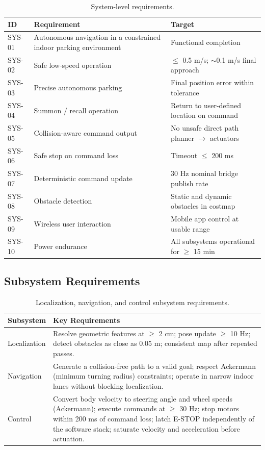 \documentclass[12pt,a4paper]{report}
\begin{document}
\begin{table}[H]
\centering
\caption{System-level requirements.}
\label{tab:sys_req}
\begin{tabularx}{\textwidth}{|p{1.7cm}|X|p{3.2cm}|}
\hline
\textbf{ID} & \textbf{Requirement} & \textbf{Target} \\
\hline
SYS-01 & Autonomous navigation in a constrained indoor parking environment & Functional completion \\
\hline
SYS-02 & Safe low-speed operation & $\leq$ 0.5 m/s; $\sim$0.1 m/s final approach \\
\hline
SYS-03 & Precise autonomous parking & Final position error within tolerance \\
\hline
SYS-04 & Summon / recall operation & Return to user-defined location on command \\
\hline
SYS-05 & Collision-aware command output & No unsafe direct path planner $\rightarrow$ actuators \\
\hline
SYS-06 & Safe stop on command loss & Timeout $\leq$ 200 ms \\
\hline
SYS-07 & Deterministic command update & 30 Hz nominal bridge publish rate \\
\hline
SYS-08 & Obstacle detection & Static and dynamic obstacles in costmap \\
\hline
SYS-09 & Wireless user interaction & Mobile app control at usable range \\
\hline
SYS-10 & Power endurance & All subsystems operational for $\geq$ 15 min \\
\hline
\end{tabularx}
\end{table}

\subsection{Subsystem Requirements}

\begin{table}[H]
\centering
\caption{Localization, navigation, and control subsystem requirements.}
\label{tab:sub_req}
\begin{tabularx}{\textwidth}{|p{3cm}|X|}
\hline
\textbf{Subsystem} & \textbf{Key Requirements} \\
\hline
Localization & Resolve geometric features at $\geq$ 2 cm; pose update $\geq$ 10 Hz; detect obstacles as close as 0.05 m; consistent map after repeated passes. \\
\hline
Navigation & Generate a collision-free path to a valid goal; respect Ackermann (minimum turning radius) constraints; operate in narrow indoor lanes without blocking localization. \\
\hline
Control & Convert body velocity to steering angle and wheel speeds (Ackermann); execute commands at $\geq$ 30 Hz; stop motors within 200 ms of command loss; latch E-STOP independently of the software stack; saturate velocity and acceleration before actuation. \\
\hline
\end{tabularx}
\end{table}
\end{document}
